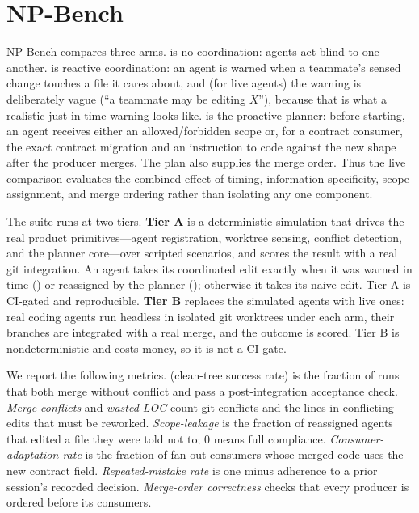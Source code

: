 \section{NP-Bench}
\label{sec:npbench}

NP-Bench compares three arms.  is no coordination: agents act blind to one another.
 is reactive coordination: an agent is warned when a teammate's sensed change touches
a file it cares about, and (for live agents) the warning is deliberately vague (``a teammate may
be editing $X$''), because that is what a realistic just-in-time warning looks like. 
is the proactive planner: before starting, an agent receives either an allowed/forbidden scope or,
for a contract consumer, the exact contract migration and an instruction to code against the new
shape after the producer merges. The plan also supplies the merge order. Thus the live comparison
evaluates the combined effect of timing, information specificity, scope assignment, and merge
ordering rather than isolating any one component.

The suite runs at two tiers. \textbf{Tier A} is a deterministic simulation that drives the real
product primitives---agent registration, worktree sensing, conflict detection, and the
planner core---over scripted scenarios, and scores the result with a real git
integration. An agent takes its coordinated edit exactly when it was warned in time ()
or reassigned by the planner (); otherwise it takes its naive edit. Tier A is
CI-gated and reproducible. \textbf{Tier B} replaces the simulated agents with live ones: real
coding agents run headless in isolated git worktrees under each arm, their branches are integrated
with a real merge, and the outcome is scored. Tier B is nondeterministic and costs money, so it is
not a CI gate.

We report the following metrics. \emph{\ctsr{}} (clean-tree success rate) is the fraction of runs
that both merge without conflict and pass a post-integration acceptance check. \emph{Merge
conflicts} and \emph{wasted LOC} count git conflicts and the lines in conflicting edits that must
be reworked. \emph{Scope-leakage} is the fraction of reassigned  agents that edited a
file they were told not to; 0 means full compliance. \emph{Consumer-adaptation rate} is the
fraction of fan-out consumers whose merged code uses the new contract field. \emph{Repeated-mistake
rate} is one minus adherence to a prior session's recorded decision. \emph{Merge-order correctness}
checks that every producer is ordered before its consumers.

